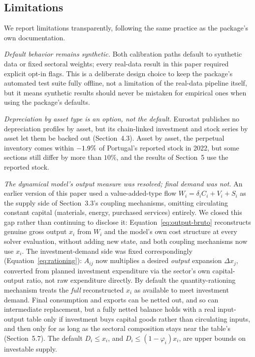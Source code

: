 \documentclass[11pt]{article}
\begin{document}
\subsection{Limitations}

We report limitations transparently, following the same practice as the
package's own documentation.

\emph{Default behavior remains synthetic.} Both calibration paths default
to synthetic data or fixed sectoral weights; every real-data result in
this paper required explicit opt-in flags. This is a deliberate design
choice to keep the package's automated test suite fully offline, not a
limitation of the real-data pipeline itself, but it means synthetic
results should never be mistaken for empirical ones when using the
package's defaults.

\emph{Depreciation by asset type is an option, not the default.}
Eurostat publishes no depreciation profiles by asset, but its
chain-linked investment and stock series by asset let them be backed
out (Section~4.3). Asset by asset, the perpetual inventory comes within
$-1.9\%$ of Portugal's reported stock in 2022, but
some sections still differ by more than $10\%$, and the results of
Section~5 use the reported stock.

\emph{The dynamical model's output measure was resolved; final demand
was not.} An earlier version of this paper used a value-added-type flow
$W_i=\delta_iC_i+V_i+S_i$ as the supply side of Section~3.3's coupling
mechanisms, omitting circulating constant capital (materials, energy,
purchased services) entirely. We closed this gap rather than continuing
to disclose it: Equation~\eqref{eq:output-bruto} reconstructs genuine
gross output $x_i$ from $W_i$ and the model's own cost structure at
every solver evaluation, without adding new state, and both coupling
mechanisms now use $x_i$. The investment-demand side was fixed
correspondingly (Equation~\eqref{eq:rationing}): $A_{ij}$ now multiplies
a desired \emph{output} expansion $\Delta x_j$, converted from planned
investment expenditure via the sector's own capital-output ratio, not
raw expenditure directly. By default the quantity-rationing mechanism
treats the \emph{full} reconstructed $x_i$ as available to meet
investment demand. Final consumption and exports can be netted out, and
so can intermediate replacement, but a fully netted balance holds with a
real input-output table only if investment buys capital goods rather
than circulating inputs, and then only for as long as the sectoral
composition stays near the table's (Section~5.7). The default
$D_i\le x_i$, and $D_i\le(1-\varphi_i)x_i$, are upper bounds on
investable supply.
\end{document}
